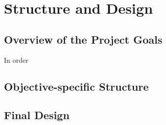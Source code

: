 \chapter{Structure and Design}

\section{Overview of the Project Goals}

In order

\section{Objective-specific Structure}

\section{Final Design}
